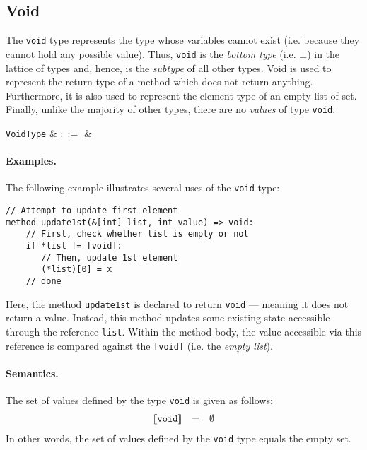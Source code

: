 
\subsection{Void}

The \lstinline{void} type represents the type whose variables cannot exist (i.e. because they cannot hold any possible value).  Thus, \lstinline{void} is the {\em bottom type} (i.e. $\bot$) in the lattice of types and, hence, is the {\em subtype} of all other types.  Void is used to represent the return type of a method which does not return anything.  Furthermore, it is also used to represent the element type of an empty list of set.  Finally, unlike the majority of other types, there are no {\em values} of type \lstinline{void}.

\begin{syntax}
   \verb+VoidType+ & $::=$ &  \\
\end{syntax}

\paragraph{Examples.} The following example illustrates several uses of the \lstinline{void} type:

\begin{lstlisting}
// Attempt to update first element
method update1st(&[int] list, int value) => void:
    // First, check whether list is empty or not
    if *list != [void]:
       // Then, update 1st element
       (*list)[0] = x
    // done
\end{lstlisting}

Here, the method \lstinline{update1st} is declared to return
\lstinline{void} --- meaning it does not return a value.  Instead,
this method updates some existing state accessible through the
reference \lstinline{list}.  Within the method body, the value
accessible via this reference is compared against the
\lstinline{[void]} (i.e. the {\em empty list}).

\paragraph{Semantics.}  The set of values defined by the type
\lstinline{void} is given as follows:
\begin{displaymath}
\begin{array}{rcl}
\llbracket{\tt void}\rrbracket & = & \emptyset\\
\end{array}
\end{displaymath}
In other words, the set of values defined by the \lstinline{void} type
equals the empty set.  

